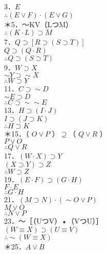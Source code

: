 3．$E$\\
$\therefore(E \vee F) \cdot(E \vee G)$\\
＊5．～KV（LつM）\\
$\therefore(K \cdot L) \supset M$\\
7．$Q \supset[R \supset(S \supset T)]$\\
$Q \supset(Q \cdot R)$\\
$\therefore Q \supset(S \supset T)$\\
9．$W \supset X$\\
$\sim Y \supset \sim X$\\
$\therefore W \supset Y$\\
11．$C \supset \sim D$\\
$\sim E \supset D$\\
$\therefore C \supset \sim \sim E$\\
13．$H \supset(I \cdot J)$\\
$I \supset(J \supset K)$\\
$\therefore H \supset K$\\
＊15．（ $O \vee P$ ）$\supseteq$（ $Q \vee R$ ）\\
$P \vee O$\\
$\therefore Q \vee R$\\
17．$(W \cdot X) \supset Y$\\
$(X \supset Y) \supset Z$\\
$\therefore W \supset Z$\\
19．$(E \cdot F) \supset(G \cdot H)$\\
$F \cdot E$\\
$\therefore G \cdot H$\\
21．$(M \supset N) \cdot(\sim O \vee P)$\\
$M \vee O$\\
$\therefore N \vee P$\\
23．～［（UつV）•（VつU）］\\
$(W \equiv X) \supset(U \equiv V)$\\
$\therefore \sim(W \equiv X)$\\
＊25．$A \vee B$

